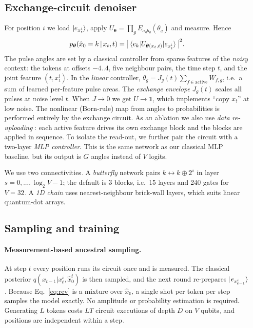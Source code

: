 \subsection{Exchange-circuit denoiser}
For position $i$ we load $\ket{e_{x_t^i}}$, apply $U_{\bm\theta}=\prod_g E_{a_gb_g}(\theta_g)$ and
measure. Hence
\begin{equation}
p_{\bm\theta}(\hat x_0=k\,|\,x_t,t)=\big|\braket{e_k|U_{\bm\theta(x_t,t)}|e_{x_t^i}}\big|^2 .
\end{equation}
The pulse angles are set by a classical controller from sparse features of the \emph{noisy} context:
the tokens at offsets $-4..4$, five neighbour pairs, the time step $t$, and the joint feature
$(t,x_t^i)$. In the \emph{linear} controller, $\theta_g=J_g(t)\sum_{f\in\mathrm{active}}W_{f,g}$, i.e.\
a sum of learned per-feature pulse areas. The \emph{exchange envelope} $J_g(t)$ scales all pulses at
noise level $t$. When $J\to0$ we get $U\to\mathbb 1$, which implements ``copy $x_t$'' at low noise.
The nonlinear (Born-rule) map from angles to probabilities is performed entirely by the exchange circuit.
As an ablation we also use \emph{data re-uploading} \citep{perez2020data}: each active feature drives
its own exchange block and the blocks are applied in sequence. To isolate the read-out, we further pair
the circuit with a two-layer \emph{MLP controller}. This is the same network as our classical MLP
baseline, but its output is $G$ angles instead of $V$ logits.

We use two connectivities. A \emph{butterfly} network pairs $k\leftrightarrow k\oplus2^s$ in layer
$s=0,\dots,\log_2V-1$; the default is 3 blocks, i.e.\ 15 layers and 240 gates for $V=32$. A
\emph{1D chain} uses nearest-neighbour brick-wall layers, which suits linear quantum-dot arrays.

\subsection{Sampling and training}
\paragraph{Measurement-based ancestral sampling.} At step $t$ every position runs its circuit once and
is measured. The classical posterior $q(x_{t-1}|x_t^i,\hat x_0^i)$ is then sampled, and the next round
re-prepares $\ket{e_{x^i_{t-1}}}$. Because Eq.~\eqref{eq:rev} is a mixture over $\hat x_0$, a single
shot per token per step samples the model exactly. No amplitude or probability estimation is required.
Generating $L$ tokens costs $LT$ circuit executions of depth $D$ on $V$ qubits, and positions are
independent within a step.
